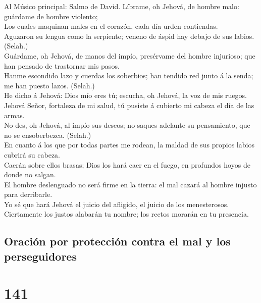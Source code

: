  Al Músico principal: Salmo de David. Líbrame, oh Jehová,
de hombre malo: guárdame de hombre violento;\\
 Los cuales maquinan males en el corazón, cada día urden
contiendas.\\
 Aguzaron su lengua como la serpiente; veneno de áspid hay
debajo de sus labios. (Selah.)\\
 Guárdame, oh Jehová, de manos del impío, presérvame del
hombre injurioso; que han pensado de trastornar mis pasos.\\
 Hanme escondido lazo y cuerdas los soberbios; han tendido
red junto á la senda; me han puesto lazos. (Selah.)\\
 He dicho á Jehová: Dios mío eres tú; escucha, oh Jehová,
la voz de mis ruegos.\\
 Jehová Señor, fortaleza de mi salud, tú pusiste á
cubierto mi cabeza el día de las armas.\\
 No des, oh Jehová, al impío sus deseos; no saques
adelante su pensamiento, que no se ensoberbezca. (Selah.)\\
 En cuanto á los que por todas partes me rodean, la maldad
de sus propios labios cubrirá su cabeza.\\
 Caerán sobre ellos brasas; Dios los hará caer en el
fuego, en profundos hoyos de donde no salgan.\\
 El hombre deslenguado no será firme en la tierra: el mal
cazará al hombre injusto para derribarle.\\
 Yo sé que hará Jehová el juicio del afligido, el juicio
de los menesterosos.\\
 Ciertamente los justos alabarán tu nombre; los rectos
morarán en tu presencia.

\hypertarget{oraciuxf3n-por-protecciuxf3n-contra-el-mal-y-los-perseguidores}{%
\subsection{Oración por protección contra el mal y los
perseguidores}\label{oraciuxf3n-por-protecciuxf3n-contra-el-mal-y-los-perseguidores}}

\hypertarget{section-19-141}{%
\section{141}\label{section-19-141}}

